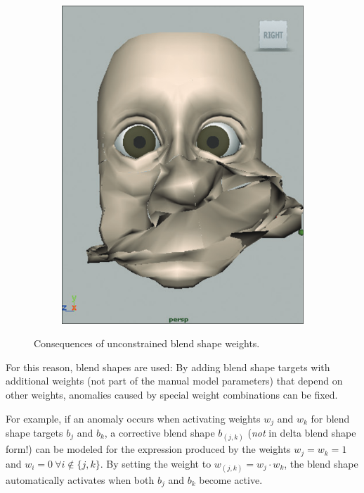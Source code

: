 \begin{figure}[h]
  \centering
  \begin{subfigure}[b]{0.25\textwidth}
	\includegraphics[scale=0.2]{img/unconstrained_weights.png}
  \end{subfigure}
  \caption{Consequences of unconstrained blend shape weights.~\autocite{directmanipulationblendshapes}}
  \label{fig:unconstrainedweights}
\end{figure}

For this reason,  blend shapes are used:
By adding blend shape targets with additional weights (not part of the manual model parameters) that depend on other weights,
anomalies caused by special weight combinations can be fixed.

For example, if an anomaly occurs when activating weights \(w_j\) and \(w_k\) for blend shape targets \(b_j\) and \(b_k\),
a corrective blend shape \(b_{(j,k)}\) (\textit{not} in delta blend shape form!) can be modeled for the expression produced by the weights \(w_j=w_k=1\) and \(w_i=0\ \forall i\notin\{j, k\}\).
By setting the weight to \(w_{(j,k)}=w_j\cdot w_k\), the blend shape automatically activates when both \(b_j\) and \(b_k\) become active.

